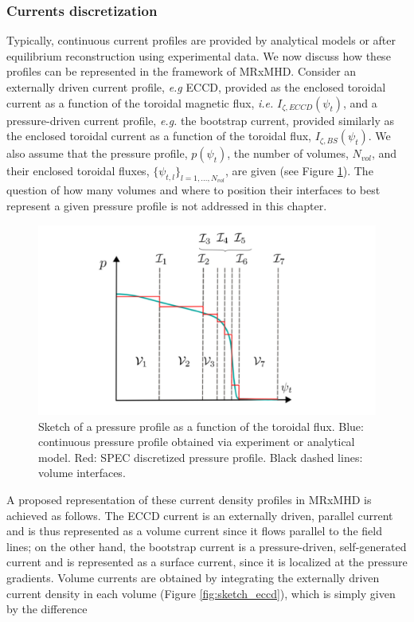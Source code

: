 \documentclass[my_thesis.tex]{subfiles}
\begin{document}
\subsubsection{Currents discretization}
Typically, continuous current profiles are provided by analytical models or after equilibrium reconstruction using experimental data. We now discuss how these profiles can be represented in the framework of \ac{MRxMHD}. Consider an externally driven current profile, \textit{e.g} \ac{ECCD}, provided as the enclosed toroidal current as a function of the toroidal magnetic flux, \textit{i.e.} $I_{\zeta,ECCD}(\psi_t)$, and a pressure-driven current profile, \textit{e.g.} the bootstrap current, provided similarly as the enclosed toroidal current as a function of the toroidal flux, $I_{\zeta,BS}(\psi_t)$. We also assume that the pressure profile, $p(\psi_t)$, the number of volumes, $N_{vol}$, and their enclosed toroidal fluxes, $\{\psi_{t,l}\}_{l=1,\ldots,N_{vol}}$, are given (see Figure \ref{fig:sketch_pressure}). The question of how many volumes and where to position their interfaces to best represent a given pressure profile is not addressed in this chapter.

\begin{figure}
    \centering
    \includegraphics[width=\linewidth]{main/Figures_CurrentConstraint/ABaillod_fig2.pdf}
    \caption{Sketch of a pressure profile as a function of the toroidal flux. Blue: continuous pressure profile obtained via experiment or analytical model. Red: SPEC discretized pressure profile. Black dashed lines: volume interfaces.}
    \label{fig:sketch_pressure}
\end{figure}

A proposed representation of these current density profiles in \ac{MRxMHD} is achieved as follows. The \ac{ECCD} current is an externally driven, parallel current and is thus represented as a volume current since it flows parallel to the field lines; on the other hand, the bootstrap current is a pressure-driven, self-generated current and is represented as a surface current, since it is localized at the pressure gradients. Volume currents are obtained by integrating the externally driven current density in each volume (Figure \ref{fig:sketch_eccd}), which is simply given by the difference
\end{document}
